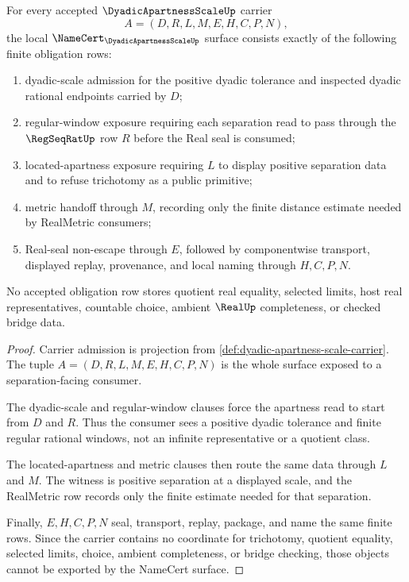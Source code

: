 \begin{theorem}
\label{thm:dyadic-apartness-scale-namecert-obligations}
For every accepted $\DyadicApartnessScaleUp$ carrier
$$
A=(D,R,L,M,E,H,C,P,N),
$$
the local $\NameCert_{\DyadicApartnessScaleUp}$ surface consists exactly of the following finite obligation rows:
\begin{enumerate}
\item dyadic-scale admission for the positive dyadic tolerance and inspected dyadic rational endpoints carried by $D$;
\item regular-window exposure requiring each separation read to pass through the $\RegSeqRatUp$ row $R$ before the Real seal is consumed;
\item located-apartness exposure requiring $L$ to display positive separation data and to refuse trichotomy as a public primitive;
\item metric handoff through $M$, recording only the finite distance estimate needed by RealMetric consumers;
\item Real-seal non-escape through $E$, followed by componentwise transport, displayed replay, provenance, and local naming through $H,C,P,N$.
\end{enumerate}
No accepted obligation row stores quotient real equality, selected limits, host real representatives, countable choice, ambient $\RealUp$ completeness, or checked bridge data.
\end{theorem}
\begin{proof}
Carrier admission is projection from \autoref{def:dyadic-apartness-scale-carrier}. The tuple $A=(D,R,L,M,E,H,C,P,N)$ is the whole surface exposed to a separation-facing consumer.

The dyadic-scale and regular-window clauses force the apartness read to start from $D$ and $R$. Thus the consumer sees a positive dyadic tolerance and finite regular rational windows, not an infinite representative or a quotient class.

The located-apartness and metric clauses then route the same data through $L$ and $M$. The witness is positive separation at a displayed scale, and the RealMetric row records only the finite estimate needed for that separation.

Finally, $E,H,C,P,N$ seal, transport, replay, package, and name the same finite rows. Since the carrier contains no coordinate for trichotomy, quotient equality, selected limits, choice, ambient completeness, or bridge checking, those objects cannot be exported by the NameCert surface.
\end{proof}

